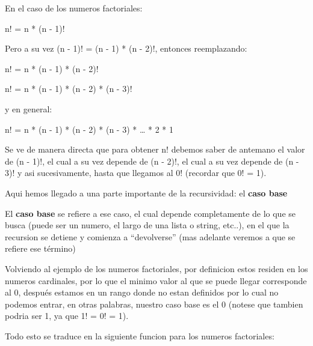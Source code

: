 \documentclass[11pt]{article}
\begin{document}
En el caso de los numeros factoriales:

n! = n * (n - 1)!

Pero a su vez (n - 1)! = (n - 1) * (n - 2)!, entonces reemplazando:

n! = n * (n - 1) * (n - 2)!

n! = n * (n - 1) * (n - 2) * (n - 3)!

y en general:

n! = n * (n - 1) * (n - 2) * (n - 3) * \ldots{} * 2 * 1

Se ve de manera directa que para obtener n! debemos saber de antemano el
valor de (n - 1)!, el cual a su vez depende de (n - 2)!, el cual a su
vez depende de (n - 3)! y asi sucesivamente, hasta que llegamos al 0!
(recordar que 0! = 1).

Aqui hemos llegado a una parte importante de la recursividad: el
\textbf{caso base}

El \textbf{caso base} se refiere a ese caso, el cual depende
completamente de lo que se busca (puede ser un numero, el largo de una
lista o string, etc..), en el que la recursion se detiene y comienza a
``devolverse'' (mas adelante veremos a que se refiere ese término)

Volviendo al ejemplo de los numeros factoriales, por definicion estos
residen en los numeros cardinales, por lo que el minimo valor al que se
puede llegar corresponde al 0, después estamos en un rango donde no
estan definidos por lo cual no podemos entrar, en otras palabras,
nuestro caso base es el 0 (notese que tambien podria ser 1, ya que 1! =
0! = 1).

Todo esto se traduce en la siguiente funcion para los numeros
factoriales:
\end{document}
